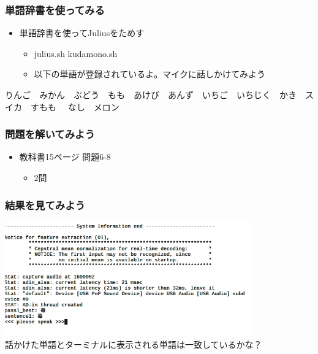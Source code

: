 \documentclass[14pt]{beamer}
\begin{document}
\begin{frame}
  \frametitle{単語辞書を使ってみる}
  \begin{itemize}
    \item 単語辞書を使ってJuliusをためす
          \begin{itemize}
            \item julius.sh kudamono.sh
            \item 以下の単語が登録されているよ。マイクに話しかけてみよう
          \end{itemize}
  \end{itemize}
  \begin{center}
    {\small りんご　みかん　ぶどう　もも　あけび　あんず　いちご　いちじく　かき　スイカ　すもも　 なし　メロン}
  \end{center}
\end{frame}

\begin{frame}
  \frametitle{問題を解いてみよう}
  \begin{itemize}
    \item 教科書15ページ 問題6-8
          \begin{itemize}
            \item 2問
          \end{itemize}
  \end{itemize}
\end{frame}

\begin{frame}
  \frametitle{結果を見てみよう}
  \centering
  \includegraphics[width=0.8\textwidth]{julius_demo_strawberry.png} \\
  話かけた単語とターミナルに表示される単語は一致しているかな？
\end{frame}
\end{document}
